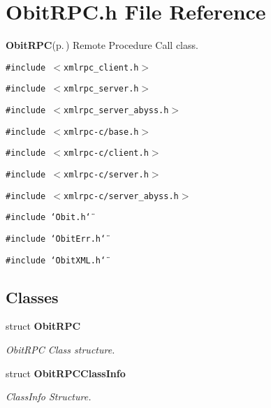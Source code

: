\section{Obit\-RPC.h File Reference}
\label{ObitRPC_8h}
{\bf Obit\-RPC}{\rm (p.\,\pageref{structObitRPC})} Remote Procedure Call class. 

{\tt \#include $<$xmlrpc\_\-client.h$>$}\par
{\tt \#include $<$xmlrpc\_\-server.h$>$}\par
{\tt \#include $<$xmlrpc\_\-server\_\-abyss.h$>$}\par
{\tt \#include $<$xmlrpc-c/base.h$>$}\par
{\tt \#include $<$xmlrpc-c/client.h$>$}\par
{\tt \#include $<$xmlrpc-c/server.h$>$}\par
{\tt \#include $<$xmlrpc-c/server\_\-abyss.h$>$}\par
{\tt \#include \char`\"{}Obit.h\char`\"{}}\par
{\tt \#include \char`\"{}Obit\-Err.h\char`\"{}}\par
{\tt \#include \char`\"{}Obit\-XML.h\char`\"{}}\par
\subsection*{Classes}
\begin{CompactItemize}
\item 
struct {\bf Obit\-RPC}
\begin{CompactList}\small\item\em Obit\-RPC Class structure. \item\end{CompactList}\item 
struct {\bf Obit\-RPCClass\-Info}
\begin{CompactList}\small\item\em Class\-Info Structure. \item\end{CompactList}\end{CompactItemize}
